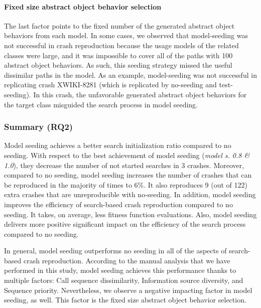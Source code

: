 \paragraph{Fixed size abstract object behavior selection}
The last factor points to the fixed number of the generated abstract object behaviors from each model. In some cases, we observed that model-seeding was not successful in crash reproduction because the usage models of the related classes were large, and it was impossible to cover all of the paths with 100 abstract object behaviors. As such, this seeding strategy missed the useful dissimilar paths in the model. As an example, model-seeding was not successful in replicating crash XWIKI-8281 (which is replicated by no-seeding and test-seeding). In this crash, the unfavorable generated abstract object behaviors for the target class misguided the search process in model seeding.


\subsubsection{Summary (\textbf{RQ2})}


Model seeding achieves a better search initialization ratio compared to no seeding. With respect to the best achievement of model seeding (\textit{model s. 0.8 \& 1.0}), they decrease the number of not started searches in 3 crashes.
%
Moreover, compared to no seeding, model seeding increases the number of crashes that can be reproduced in the majority of times to 6\%. It also reproduces 9 (out of 122) extra crashes that are unreproducible with no-seeding. 
%
In addition, model seeding improves the efficiency of search-based crash reproduction compared to no seeding. It takes, on average, less fitness function evaluations. Also, model seeding delivers more positive significant impact on the efficiency of the search process compared to no seeding.
%

In general, model seeding outperforms no seeding in all of the aspects of search-based crash reproduction. According to the manual analysis that we have performed in this study, model seeding achieves this performance thanks to multiple factors: Call sequence dissimilarity, Information source diversity, and Sequence priority. Nevertheless, we observe a negative impacting factor in model seeding, as well. This factor is the fixed size abstract object behavior selection.


